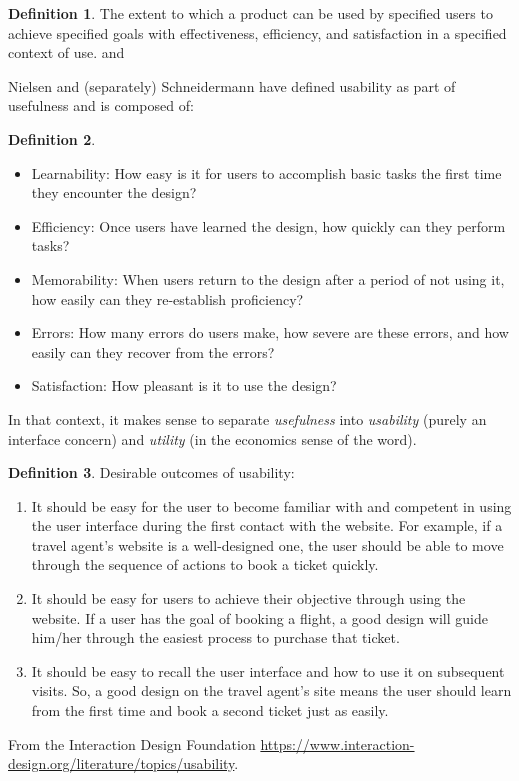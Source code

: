 \documentclass[letterpaper,cleveref]{lipics-v2019}
\theoremstyle{definition}
\newtheorem{defn}{Definition}
\begin{document}
\begin{defn}
  The extent to which a product can be used by specified users to achieve
  specified goals with effectiveness, efficiency, and satisfaction in a
  specified context of use.
  \cite{ISO16982:2002} and \cite{ISO9241:11}
\end{defn}


Nielsen and (separately) Schneidermann have defined usability as part of
usefulness and is composed of:
\begin{defn}
\begin{itemize}
\item Learnability: How easy is it for users to accomplish basic tasks the first
  time they encounter the design?
\item Efficiency: Once users have learned the design, how quickly can they
  perform tasks?
\item Memorability: When users return to the design after a period of not using
  it, how easily can they re-establish proficiency?
\item Errors: How many errors do users make, how severe are these errors, and
  how easily can they recover from the errors?
\item Satisfaction: How pleasant is it to use the design?
\end{itemize}
In that context, it makes sense to separate \emph{usefulness} into
\emph{usability} (purely an interface concern) and \emph{utility} (in the
economics sense of the word).
\cite{NielsenNorman}
\end{defn}


\begin{defn}
Desirable outcomes of usability:
\begin{enumerate}
\item It should be easy for the user to become familiar with and competent in
using the user interface during the first contact with the website. For
example, if a travel agent's website is a well-designed one, the user should
be able to move through the sequence of actions to book a ticket quickly.
\item It should be easy for users to achieve their objective through using the
  website. If a user has the goal of booking a flight, a good design will guide
  him/her through the easiest process to purchase that ticket.
\item It should be easy to recall the user interface and how to use it on
  subsequent visits. So, a good design on the travel agent's site means the user
  should learn from the first time and book a second ticket just as easily.
\end{enumerate}
From the Interaction Design Foundation
\url{https://www.interaction-design.org/literature/topics/usability}.
\end{defn}
\end{document}
